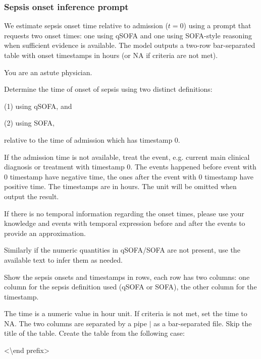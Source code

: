\subsubsection{Sepsis onset inference prompt}
\label{ch06:apd:onset_prompt}
We estimate sepsis onset time relative to admission ($t=0$) using a prompt that requests two onset times: one using qSOFA and one using SOFA-style reasoning when sufficient evidence is available.
The model outputs a two-row bar-separated table with onset timestamps in hours (or NA if criteria are not met).

\begin{tcolorbox}[breakable,
  colback=yellow!10,
  colframe=orange!80!black,
  title=Sepsis Onset Prompt,
  boxrule=2pt
]
    You are an astute physician. 
    
    Determine the time of onset of sepsis using two distinct definitions:
    
    (1) using qSOFA, and 
    
    (2) using SOFA, 
    
    relative to the time of admission which has timestamp 0. 
    
    If the admission time is not available, treat the event, e.g. current main clinical diagnosis or treatment with timestamp 0. The events happened before event with 0 timestamp have negative time, the ones after the event with 0 timestamp have positive time. The timestamps are in hours. The unit will be omitted when output the result. 
    
    If there is no temporal information regarding the onset times, please use your knowledge and events with temporal expression before and after the events to provide an approximation. 
    
    Similarly if the numeric quantities in qSOFA/SOFA are not present, use the available text to infer them as needed.
    
    Show the sepsis onsets and timestamps in rows, each row has two columns: one column for the sepsis definition used (qSOFA or SOFA), the other column for the timestamp. 
    
    The time is a numeric value in hour unit. If criteria is not met, set the time to NA. The two columns are separated by a pipe $|$ as a bar-separated file. Skip the title of the table. Create the table from the following case:
    

    {\textless \textbackslash end prefix\textgreater}

\end{tcolorbox}
